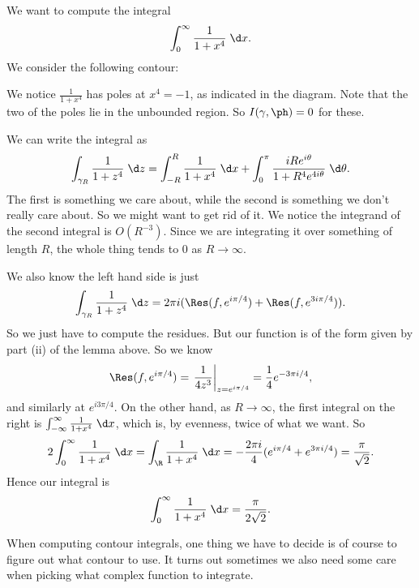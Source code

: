 \documentclass[a4paper]{article}
\begin{document}
\begin{eg}
  We want to compute the integral
  \[
    \int_0^{\infty} \frac{1}{1 + x^4}\;\d x.
  \]
  We consider the following contour:
  \begin{center}
  \end{center}
  We notice $\frac{1}{1 + x^4}$ has poles at $x^4 = -1$, as indicated in the diagram. Note that the two of the poles lie in the unbounded region. So $I(\gamma, \ph) = 0$ for these.

  We can write the integral as
  \[
    \int_{\gamma_R} \frac{1}{1 + z^4} \;\d z = \int_{-R}^R \frac{1}{1 + x^4} \;\d x + \int_0^\pi \frac{i Re^{i\theta}}{1 + R^4 e^{4 i \theta}}\;\d \theta.
  \]
  The first is something we care about, while the second is something we don't really care about. So we might want to get rid of it. We notice the integrand of the second integral is $O(R^{-3})$. Since we are integrating it over something of length $R$, the whole thing tends to $0$ as $R \to \infty$.

  We also know the left hand side is just
  \[
    \int_{\gamma_R} \frac{1}{1 + z^4} \;\d z = 2\pi i(\Res(f, e^{i \pi /4}) + \Res(f, e^{3i \pi /4})).
  \]
  So we just have to compute the residues. But our function is of the form given by part (ii) of the lemma above. So we know
  \[
    \Res(f, e^{i \pi /4}) = \left.\frac{1}{4z^3}\right|_{z = e^{i \pi /4}} = \frac{1}{4} e^{-3\pi i/4},
  \]
  and similarly at $e^{i 3\pi /4}$. On the other hand, as $R \to \infty$, the first integral on the right is $\int_{-\infty}^\infty \frac{1}{1 + x^4}\;\d x$, which is, by evenness, twice of what we want. So
  \[
    2\int_0^\infty \frac{1}{1 + x^4} \;\d x = \int_\R \frac{1}{1 + x^4}\;\d x = -\frac{2\pi i}{4} (e^{i \pi/4} + e^{3 \pi i/4}) = \frac{\pi}{\sqrt{2}}.
  \]
  Hence our integral is
  \[
    \int_0^\infty \frac{1}{1 + x^4}\;\d x = \frac{\pi}{2\sqrt{2}}.
  \]
\end{eg}
When computing contour integrals, one thing we have to decide is of course to figure out what contour to use. It turns out sometimes we also need some care when picking what complex function to integrate.
\end{document}
